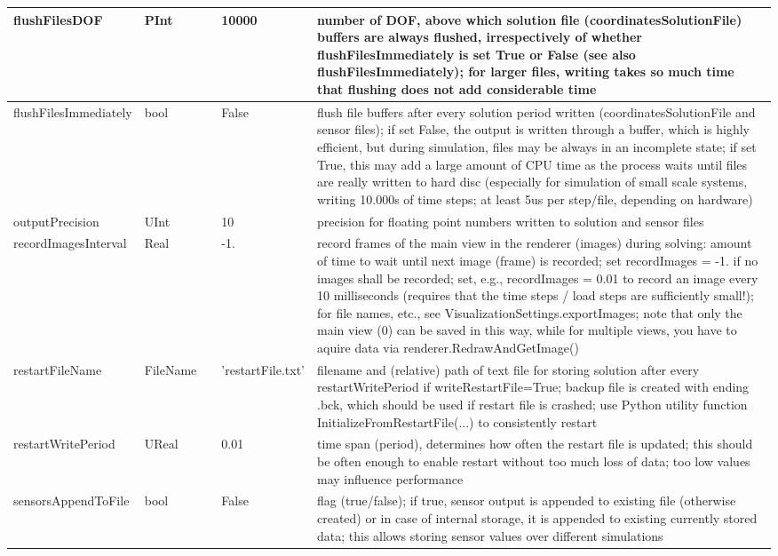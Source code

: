 \begin{center}
\begin{longtable}{| p{4.2cm} | p{2.5cm} | p{0.3cm} | p{3.0cm} | p{6cm} |}
    flushFilesDOF &     PInt &      &     10000 &     number of DOF, above which solution file (coordinatesSolutionFile) buffers are always flushed, irrespectively of whether flushFilesImmediately is set True or False (see also flushFilesImmediately); for larger files, writing takes so much time that flushing does not add considerable time\\ \hline
    flushFilesImmediately &     bool &      &     False &     flush file buffers after every solution period written (coordinatesSolutionFile and sensor files); if set False, the output is written through a buffer, which is highly efficient, but during simulation, files may be always in an incomplete state; if set True, this may add a large amount of CPU time as the process waits until files are really written to hard disc (especially for simulation of small scale systems, writing 10.000s of time steps; at least 5us per step/file, depending on hardware)\\ \hline
    outputPrecision &     UInt &      &     10 &     precision for floating point numbers written to solution and sensor files\\ \hline
    recordImagesInterval &     Real &      &     -1. &     record frames of the main view in the renderer (images) during solving: amount of time to wait until next image (frame) is recorded; set recordImages = -1. if no images shall be recorded; set, e.g., recordImages = 0.01 to record an image every 10 milliseconds (requires that the time steps / load steps are sufficiently small!); for file names, etc., see VisualizationSettings.exportImages; note that only the main view (0) can be saved in this way, while for multiple views, you have to aquire data via renderer.RedrawAndGetImage()\\ \hline
    restartFileName &     FileName &      &     'restartFile.txt' &     filename and (relative) path of text file for storing solution after every restartWritePeriod if writeRestartFile=True; backup file is created with ending .bck, which should be used if restart file is crashed; use Python utility function InitializeFromRestartFile(...) to consistently restart\\ \hline
    restartWritePeriod &     UReal &      &     0.01 &     time span (period), determines how often the restart file is updated; this should be often enough to enable restart without too much loss of data; too low values may influence performance\\ \hline
    sensorsAppendToFile &     bool &      &     False &     flag (true/false); if true, sensor output is appended to existing file (otherwise created) or in case of internal storage, it is appended to existing currently stored data; this allows storing sensor values over different simulations\\ \hline

\end{longtable}
\end{center}
